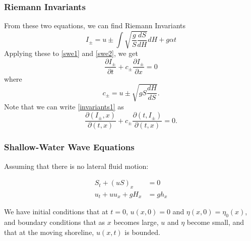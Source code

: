 \begin{frame}
\frametitle{Riemann Invariants}
From these two equations, we can find Riemann Invariants
\[
I_\pm = u \pm \int \sqrt{\frac{g}{S}\frac{dS}{dH}} dH + g \alpha t
\]
Applying these to \eqref{swe1} and \eqref{swe2}, we get
\begin{equation}\label{invariants1}
\frac{\partial I_\pm}{\partial t} + c_{\pm} \frac{\partial I_\pm}{\partial x} = 0
\end{equation}
where
\[
c_\pm = u \pm \sqrt{g S \frac{dH}{dS}}.
\]
Note that we can write \eqref{invariants1} as
\[
\frac{\partial (I_\pm, x)}{\partial (t,x)} + c_\pm \frac{\partial(t, I_\pm)}{\partial (t,x)} = 0.
\]
\end{frame}
	\begin{frame}
		\frametitle{Shallow-Water Wave Equations}
		Assuming that there is no lateral fluid motion:
		\begin{framed} \begin{align}
			\label{swe1} S_t + (uS)_x &= 0\\
			\label{swe2} u_t + u u_x + g H_x &= g h_x
		\end{align} \end{framed}
		We have initial conditions that at $t=0$, $u(x,0) = 0$ and $\eta(x,0) = \eta_0(x)$, and boundary conditions that as $x$ becomes large, $u$ and $\eta$ become small, and that at the moving shoreline, $u(x,t)$ is bounded.
	\end{frame}

